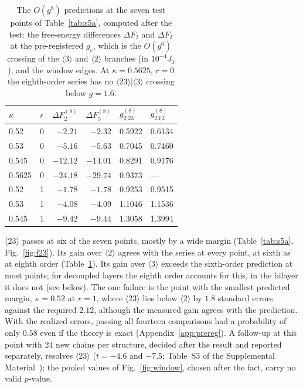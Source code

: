 \documentclass[
 aps,prb,
 twocolumn,
 superscriptaddress,
 longbibliography,
 nofootinbib,
 floatfix
]{revtex4-2}
\begin{document}
\begin{table}
\caption{The $O(g^8)$ predictions at the seven test points of Table~\ref{tab:s5a}, computed after the test: the
free-energy differences $\Delta F_2$ and $\Delta F_3$ at the pre-registered $g_c$, which is the $O(g^6)$ crossing of the
$\langle3\rangle$ and $\langle2\rangle$ branches (in $10^{-4}J_0$), and the window edges. At $\kappa=0.5625$, $r=0$ the eighth-order series has no $\langle23\rangle|\langle3\rangle$ crossing below
$g=1.6$.}
\label{tab:s5a8}
\begin{ruledtabular}
\begin{tabular}{llrrll}
$\kappa$ & $r$ & $\Delta F_2^{(8)}$ & $\Delta F_3^{(8)}$ & $g_{2|23}^{(8)}$ & $g_{23|3}^{(8)}$ \\
\hline
0.52 & 0 & $-2.21$ & $-2.32$ & 0.5922 & 0.6134 \\
0.53 & 0 & $-5.16$ & $-5.63$ & 0.7045 & 0.7460 \\
0.545 & 0 & $-12.12$ & $-14.01$ & 0.8291 & 0.9176 \\
0.5625 & 0 & $-24.18$ & $-29.74$ & 0.9373 & --- \\
0.52 & 1 & $-1.78$ & $-1.78$ & 0.9253 & 0.9515 \\
0.53 & 1 & $-4.08$ & $-4.09$ & 1.1046 & 1.1536 \\
0.545 & 1 & $-9.42$ & $-9.44$ & 1.3058 & 1.3994 \\
\end{tabular}
\end{ruledtabular}
\end{table}

$\langle23\rangle$ passes at six of the seven points, mostly by a wide margin (Table~\ref{tab:s5a},
Fig.~\ref{fig:f23}). Its gain over $\langle2\rangle$ agrees with the series at every point, at sixth as at eighth
order (Table~\ref{tab:s5a8}). Its gain over $\langle3\rangle$ exceeds the sixth-order prediction at most points; for
decoupled layers the eighth order accounts for this, in the bilayer it does not (see below). The one failure is the
point with the smallest predicted margin, $\kappa=0.52$ at $r=1$, where $\langle23\rangle$ lies below $\langle2\rangle$
by $1.8$ standard errors against the required $2.12$, although the measured gain agrees with the prediction. With the
realized errors, passing all fourteen comparisons had a probability of only $0.58$ even if the theory is exact
(Appendix~\ref{app:prereg}). A follow-up at this point with 24 new chains per structure, decided after the result and
reported separately, resolves $\langle23\rangle$ ($t=-4.6$ and $-7.5$; Table~S3 of the Supplemental Material~\cite{supp}); the pooled values of
Fig.~\ref{fig:window}, chosen after the fact, carry no valid $p$-value.
\end{document}

